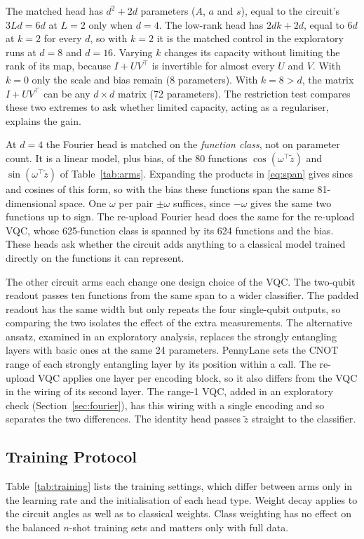 \documentclass{ieeeaccess}
\newcommand{\vqc}{VQC}
\begin{document}
The matched head has $d^2+2d$ parameters ($A$, $a$ and $s$), equal to the circuit's $3Ld=6d$ at $L=2$ only when $d=4$. The low-rank head has $2dk+2d$, equal to $6d$ at $k=2$ for every $d$, so with $k=2$ it is the matched control in the exploratory runs at $d=8$ and $d=16$. Varying $k$ changes its capacity without limiting the rank of its map, because $I+UV^{\!\top}$ is invertible for almost every $U$ and $V$. With $k=0$ only the scale and bias remain (8 parameters). With $k=8>d$, the matrix $I+UV^{\!\top}$ can be any $d\times d$ matrix (72 parameters). The restriction test compares these two extremes to ask whether limited capacity, acting as a regulariser, explains the gain.

At $d=4$ the Fourier head is matched on the \emph{function class}, not on parameter count. It is a linear model, plus bias, of the 80 functions $\cos(\omega^{\top}\tilde z)$ and $\sin(\omega^{\top}\tilde z)$ of Table~\ref{tab:arms}. Expanding the products in \eqref{eq:span} gives sines and cosines of this form, so with the bias these functions span the same 81-dimensional space. One $\omega$ per pair $\pm\omega$ suffices, since $-\omega$ gives the same two functions up to sign. The re-upload Fourier head does the same for the re-upload \vqc{}, whose 625-function class is spanned by its 624 functions and the bias. These heads ask whether the circuit adds anything to a classical model trained directly on the functions it can represent.

The other circuit arms each change one design choice of the \vqc{}. The two-qubit readout passes ten functions from the same span to a wider classifier. The padded readout has the same width but only repeats the four single-qubit outputs, so comparing the two isolates the effect of the extra measurements. The alternative ansatz, examined in an exploratory analysis, replaces the strongly entangling layers with basic ones at the same 24 parameters. PennyLane sets the CNOT range of each strongly entangling layer by its position within a call. The re-upload \vqc{} applies one layer per encoding block, so it also differs from the \vqc{} in the wiring of its second layer. The range-1 \vqc{}, added in an exploratory check (Section~\ref{sec:fourier}), has this wiring with a single encoding and so separates the two differences. The identity head passes $\tilde z$ straight to the classifier.

\subsection{Training Protocol}
Table~\ref{tab:training} lists the training settings, which differ between arms only in the learning rate and the initialisation of each head type. Weight decay applies to the circuit angles as well as to classical weights. Class weighting has no effect on the balanced $n$-shot training sets and matters only with full data.
\end{document}
